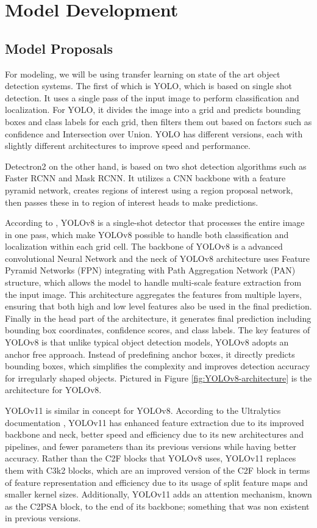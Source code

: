 \documentclass[stu,12pt,floatsintext]{apa7}
\begin{document}
\section{Model Development}
\subsection{Model Proposals}
For modeling, we will be using transfer learning on state of the art object detection systems. The first of which is YOLO, which is based on single shot detection. It uses a single pass of the input image to perform classification and localization. For YOLO, it divides the image into a grid and predicts bounding boxes and class labels for each grid, then filters them out based on factors such as confidence and Intersection over Union. YOLO has different versions, each with slightly different architectures to improve speed and performance.

Detectron2 on the other hand, is based on two shot detection algorithms such as Faster RCNN and Mask RCNN. It utilizes a CNN backbone with a feature pyramid network, creates regions of interest using a region proposal network, then passes these in to region of interest heads to make predictions.

According to \textcite{yaseen_what_2024},  YOLOv8 is a single-shot detector that processes the entire image in one pass, which make YOLOv8 possible to handle both classification and localization within each grid cell. The backbone of YOLOv8 is a advanced convolutional Neural Network and the neck of YOLOv8 architecture uses Feature Pyramid Networks (FPN) integrating with Path Aggregation Network (PAN) structure, which allows the model to handle multi-scale feature extraction from the input image. This architecture aggregates the features from multiple layers, ensuring that both high and low level features also be used in the final prediction. Finally in the head part of the architecture, it generates final prediction including bounding box coordinates, confidence scores, and class labels. The key features of YOLOv8 is that unlike typical object detection models, YOLOv8 adopts an anchor free approach. Instead of predefining anchor boxes, it directly predicts bounding boxes, which simplifies the complexity and improves detection accuracy for irregularly shaped objects. Pictured in Figure \ref{fig:YOLOv8-architecture} is the architecture for YOLOv8.

YOLOv11 is similar in concept for YOLOv8. According to the Ultralytics documentation \parencite{yolo11_ultralytics}, YOLOv11 has enhanced feature extraction due to its improved backbone and neck, better speed and efficiency due to its new architectures and pipelines, and fewer parameters than its previous versions while having better accuracy. Rather than the C2F blocks that YOLOv8 uses, YOLOv11 replaces them with C3k2 blocks, which are an improved version of the C2F block in terms of feature representation and efficiency due to its usage of split feature maps and smaller kernel sizes. Additionally, YOLOv11 adds an attention mechanism, known as the C2PSA block, to the end of its backbone; something that was non existent in previous versions.
\end{document}
